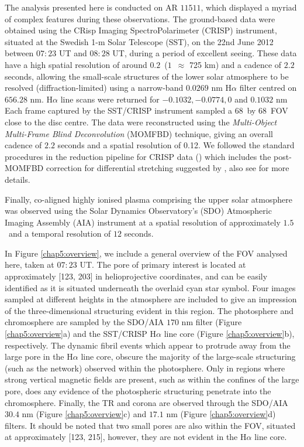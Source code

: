	The analysis presented here is conducted on AR $11511$, which displayed a myriad of complex features during these observations.
	The ground-based data were obtained using the CRisp Imaging SpectroPolarimeter (CRISP)\citep{Scharmer2008} instrument, situated at the Swedish 1-m Solar Telescope (SST), on the 22nd June 2012 between $07:23$ UT and $08:28$ UT, during a period of excellent seeing.
	These data have a high spatial resolution of around $0.2$\arcsecs\ ($1$\arcsecs\ $\approx$ 725 km) and a cadence of $2.2$ seconds, allowing the small-scale structures of the lower solar atmosphere to be resolved (diffraction-limited) using a narrow-band $0.0269$ nm H$\alpha$ filter centred on $656.28$ nm.
	H$\alpha$ line scans were returned for $-0.1032, -0.0774, 0$ and $0.1032$ nm
	Each frame captured by the SST/CRISP instrument sampled a $68$\arcsecs\ by $68$\arcsecs\ FOV close to the disc centre.
	The data were reconstructed using the {\it Multi-Object Multi-Frame Blind Deconvolution} (MOMFBD) technique, giving an overall cadence of $2.2$ seconds and a spatial resolution of 0.12\arcsecs\citep{Noort2005}.
	We followed the standard procedures in the reduction pipeline for CRISP data (\citet{2015A&A...573A..40D}) which includes the post-MOMFBD correction for differential stretching suggested by \citet{2012A&A...548A.114H}, also see \citet{2013ApJ...769...44S} for more details.

	Finally, co-aligned highly ionised plasma comprising the upper solar atmosphere was observed using the Solar Dynamics Observatory's (SDO) Atmospheric Imaging Assembly (AIA) instrument at a spatial resolution of approximately $1.5$\arcsecs\ and a temporal resolution of $12$ seconds.

	In Figure \ref{chap5:overview}, we include a general overview of the FOV analysed here, taken at $07:23$ UT.
	The pore of primary interest is located at approximately [123\arcsecs, 203\arcsecs] in helioprojective coordinates, and can be easily identified as it is situated underneath the overlaid cyan star symbol.
	Four images sampled at different heights in the atmosphere are included to give an impression of the three-dimensional structuring evident in this region.
	The photosphere and chromosphere are sampled by the SDO/AIA $170$ nm filter (Figure \ref{chap5:overview}a) and the SST/CRISP H$\alpha$ line core (Figure \ref{chap5:overview}b), respectively.
	The dynamic fibril events which appear to protrude away from the large pore in the H$\alpha$ line core, obscure the majority of the large-scale structuring (such as the network) observed within the photosphere.
	Only in regions where strong vertical magnetic fields are present, such as within the confines of the large pore, does any evidence of the photospheric structuring penetrate into the chromosphere.
	Finally, the TR and corona are observed through the SDO/AIA $30.4$ nm (Figure \ref{chap5:overview}c) and $17.1$ nm (Figure \ref{chap5:overview}d) filters.
	It should be noted that two small pores are also within the FOV, situated at approximately  [123\arcsecs, 215\arcsecs], however, they are not evident in the H$\alpha$ line core.

